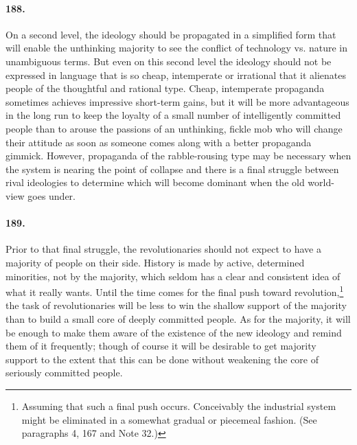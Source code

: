 \documentclass[12pt]{book}
\begin{document}
\paragraph{188.}  On a second level, the ideology should be propagated in a simplified form that will enable the unthinking majority to see the conflict of technology vs. nature in unambiguous terms. But even on this second level the ideology should not be expressed in language that is so cheap, intemperate or irrational that it alienates people of the thoughtful and rational type. Cheap, intemperate propaganda sometimes achieves impressive short-term gains, but it will be more advantageous in the long run to keep the loyalty of a small number of intelligently committed people than to arouse the passions of an unthinking, fickle mob who will change their attitude as soon as someone comes along with a better propaganda gimmick.  However, propaganda of the rabble-rousing type may be necessary when the system is nearing the point of collapse and there is a final struggle between rival ideologies to determine which will become dominant when the old world-view goes under.


\paragraph{189.}  Prior to that final struggle, the revolutionaries should not expect to have a majority of people on their side. History is made by active, determined minorities, not by the majority, which seldom has a clear and consistent idea of what it really wants. Until the time comes for the final push toward revolution,\footnote{Assuming that such a final push occurs. Conceivably the industrial system might be eliminated in a somewhat gradual or piecemeal fashion. (See paragraphs 4, 167 and Note 32.)} the task of revolutionaries will be less to win the shallow support of the majority than to build a small core of deeply committed people. As for the majority, it will be enough to make them aware of the existence of the new ideology and remind them of it frequently; though of course it will be desirable to get majority support to the extent that this can be done without weakening the core of seriously committed people.
\end{document}
